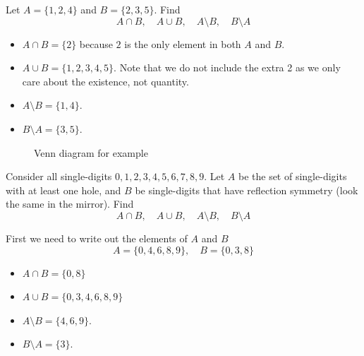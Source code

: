 \begin{frame}[t]
\begin{ex}
Let $A = \{1,2,4\}$ and $B = \{2,3,5\}$.  Find
\[A \cap B, \quad A \cup B, \quad A \setminus B, \quad B \setminus A\]
\end{ex}
\begin{sol}
\begin{itemize}
\item $A \cap B = \{2\}$ because $2$ is the only element in both $A$ and $B$. 
\item $A \cup B = \{1,2,3,4,5\}$. Note that we do not include the extra 2 as we only care about the existence, not quantity. 
\item $A \setminus B = \{1,4\}$.
\item $B \setminus A = \{3,5\}$.
\end{itemize}

\begin{figure}[h!]
\centering
{}
\caption{Venn diagram for example \theexample}
\end{figure}
\end{sol}
\end{frame}


\begin{frame}[t]
\begin{ex}
Consider all single-digits $0,1,2,3,4,5,6,7,8,9$. Let $A$ be the set of single-digits  with at least one hole, and $B$ be single-digits that have reflection symmetry (look the same in the mirror).  Find
\[A \cap B, \quad A \cup B, \quad A \setminus B, \quad B \setminus A\]
\end{ex}
\begin{sol}
First we need to write out the elements of $A$ and $B$
\[ A = \{0,4,6,8,9\}, \quad B = \{0,3,8\} \]
\begin{itemize}
\item $A \cap B = \{0,8\}$ 
\item $A \cup B = \{0,3,4,6,8,9\}$ 
\item $A \setminus B = \{4,6,9\}$.
\item $B \setminus A = \{3\}$.
\end{itemize}
\end{sol}
\end{frame}

